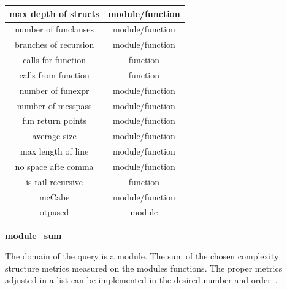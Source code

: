 \begin{table}[!htb]
{\begin{tabular}{|c|c|}
		  	\hline
		  	max depth of structs		& module/function		  			  
		  	\\		  			

		  	\hline
		  	number of funclauses		& module/function		  			  
		  	\\			
	
		  	\hline
		  	branches of recursion		& module/function		  			  
		  	\\			

		  	\hline
		  	calls for function			& function		  			  
		  	\\			
			
		  	\hline
		  	calls from function			& function		  			  
		  	\\	

		  	\hline
		  	number of funexpr			& module/function		  			  
		  	\\
		  	
		  	\hline
		  	number of messpass			& module/function		  			  
		  	\\		  	

		  	\hline
		  	fun return points			& module/function		  			  
		  	\\	
		  	
		  	\hline
		  	average size				& module/function		  			  
		  	\\		  		  	

		  	\hline
		  	max length of line			& module/function		  			  
		  	\\
		  	
		  	\hline
		  	no space afte  comma		& module/function		  			  
		  	\\	
		  	
		  	\hline
		  	is tail recursive			& function		  			  
		  	\\		  	

		  	\hline
		  	mcCabe						& module/function		  			  
		  	\\	
		  			  	
		  	\hline
		  	otpused						& module		  			  
		  	\\			  	
		  	\hline		  		  			  				
		\end{tabular}}
	\end{table}

\textbf{module\_sum}

The domain of the query is a module. The sum of the chosen complexity structure metrics measured on the modules functions. The proper metrics adjusted in a list can be implemented in the desired number and order~\cite{refactorerl}.

